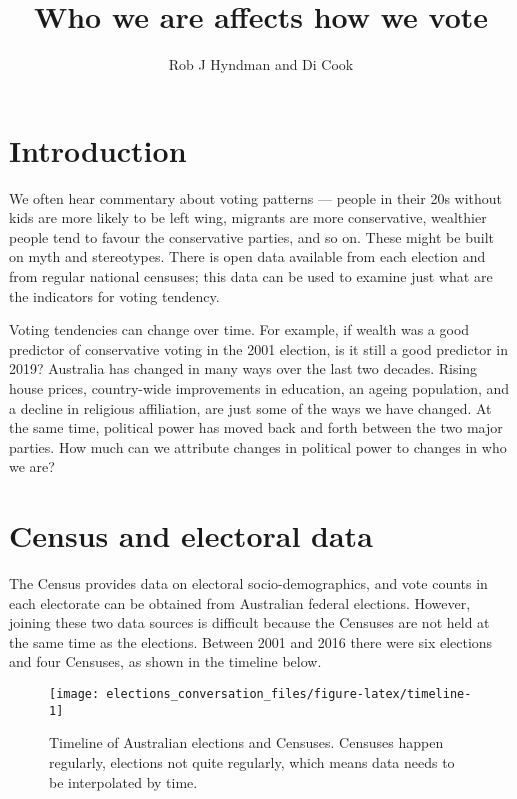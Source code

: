 \documentclass[11pt,a4paper,]{article}
\title{Who we are affects how we vote}
\author{Rob J Hyndman and Di Cook}
\date{}
\begin{document}
\maketitle

\hypertarget{intro}{%
\section{Introduction}\label{intro}}

We often hear commentary about voting patterns --- people in their 20s without kids are more likely to be left wing, migrants are more conservative, wealthier people tend to favour the conservative parties, and so on. These might be built on myth and stereotypes. There is open data available from each election and from regular national censuses; this data can be used to examine just what are the indicators for voting tendency.

Voting tendencies can change over time. For example, if wealth was a good predictor of conservative voting in the 2001 election, is it still a good predictor in 2019? Australia has changed in many ways over the last two decades. Rising house prices, country-wide improvements in education, an ageing population, and a decline in religious affiliation, are just some of the ways we have changed. At the same time, political power has moved back and forth between the two major parties. How much can we attribute changes in political power to changes in who we are?

\hypertarget{census-and-electoral-data}{%
\section{Census and electoral data}\label{census-and-electoral-data}}

The Census provides data on electoral socio-demographics, and vote counts in each electorate can be obtained from Australian federal elections. However, joining these two data sources is difficult because the Censuses are not held at the same time as the elections. Between 2001 and 2016 there were six elections and four Censuses, as shown in the timeline below.

\begin{figure}[H]

{\centering \texttt{[image: elections\_conversation\_files/figure-latex/timeline-1]} 

}

\caption{Timeline of Australian elections and Censuses. Censuses happen regularly, elections not quite regularly, which means data needs to be interpolated by time.}\label{fig:timeline}
\end{figure}
\end{document}
